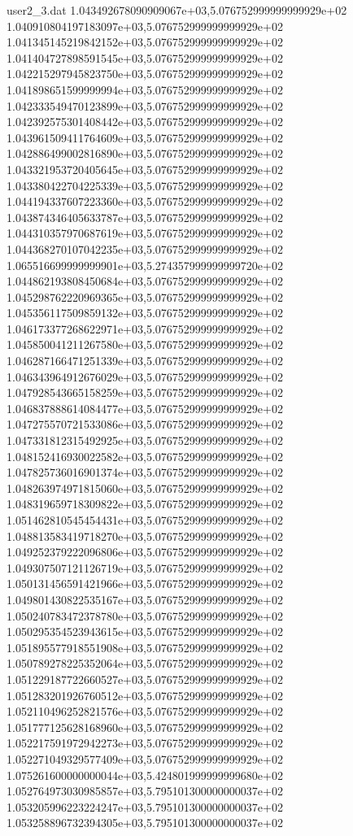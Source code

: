 \begin{filecontents}{user2_3.dat}
1.043492678090909067e+03,5.076752999999999929e+02
1.040910804197183097e+03,5.076752999999999929e+02
1.041345145219842152e+03,5.076752999999999929e+02
1.041404727898591545e+03,5.076752999999999929e+02
1.042215297945823750e+03,5.076752999999999929e+02
1.041898651599999994e+03,5.076752999999999929e+02
1.042333549470123899e+03,5.076752999999999929e+02
1.042392575301408442e+03,5.076752999999999929e+02
1.043961509411764609e+03,5.076752999999999929e+02
1.042886499002816890e+03,5.076752999999999929e+02
1.043321953720405645e+03,5.076752999999999929e+02
1.043380422704225339e+03,5.076752999999999929e+02
1.044194337607223360e+03,5.076752999999999929e+02
1.043874346405633787e+03,5.076752999999999929e+02
1.044310357970687619e+03,5.076752999999999929e+02
1.044368270107042235e+03,5.076752999999999929e+02
1.065516699999999901e+03,5.274357999999999720e+02
1.044862193808450684e+03,5.076752999999999929e+02
1.045298762220969365e+03,5.076752999999999929e+02
1.045356117509859132e+03,5.076752999999999929e+02
1.046173377268622971e+03,5.076752999999999929e+02
1.045850041211267580e+03,5.076752999999999929e+02
1.046287166471251339e+03,5.076752999999999929e+02
1.046343964912676029e+03,5.076752999999999929e+02
1.047928543665158259e+03,5.076752999999999929e+02
1.046837888614084477e+03,5.076752999999999929e+02
1.047275570721533086e+03,5.076752999999999929e+02
1.047331812315492925e+03,5.076752999999999929e+02
1.048152416930022582e+03,5.076752999999999929e+02
1.047825736016901374e+03,5.076752999999999929e+02
1.048263974971815060e+03,5.076752999999999929e+02
1.048319659718309822e+03,5.076752999999999929e+02
1.051462810545454431e+03,5.076752999999999929e+02
1.048813583419718270e+03,5.076752999999999929e+02
1.049252379222096806e+03,5.076752999999999929e+02
1.049307507121126719e+03,5.076752999999999929e+02
1.050131456591421966e+03,5.076752999999999929e+02
1.049801430822535167e+03,5.076752999999999929e+02
1.050240783472378780e+03,5.076752999999999929e+02
1.050295354523943615e+03,5.076752999999999929e+02
1.051895577918551908e+03,5.076752999999999929e+02
1.050789278225352064e+03,5.076752999999999929e+02
1.051229187722660527e+03,5.076752999999999929e+02
1.051283201926760512e+03,5.076752999999999929e+02
1.052110496252821576e+03,5.076752999999999929e+02
1.051777125628168960e+03,5.076752999999999929e+02
1.052217591972942273e+03,5.076752999999999929e+02
1.052271049329577409e+03,5.076752999999999929e+02
1.075261600000000044e+03,5.424801999999999680e+02
1.052764973030985857e+03,5.795101300000000037e+02
1.053205996223224247e+03,5.795101300000000037e+02
1.053258896732394305e+03,5.795101300000000037e+02

\end{filecontents}

